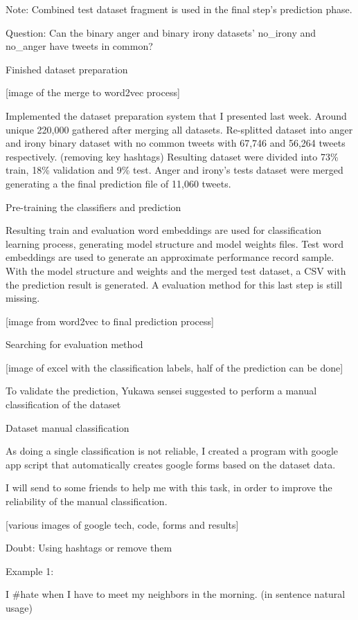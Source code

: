 Note: Combined test dataset fragment is used in the final step’s prediction phase.

Question:
Can the binary anger and binary irony datasets’ no\_irony and no\_anger have tweets in common?

Finished dataset preparation

[image of the merge to word2vec process]

Implemented the dataset preparation system that I presented last week.
Around unique 220,000 gathered after merging all datasets.
Re-splitted dataset into anger and irony binary dataset with no common tweets with 67,746 and 56,264 tweets respectively. (removing key hashtags)
Resulting dataset were divided into 73\% train, 18\% validation and 9\% test.
Anger and irony’s tests dataset were merged generating a the final prediction file of 11,060 tweets.

Pre-training the classifiers and prediction

Resulting train and evaluation word embeddings are used for classification learning process, generating model structure and model weights files.
Test word embeddings are used to generate an approximate performance record sample.
With the model structure and weights and the merged test dataset, a CSV with the prediction result is generated.
A evaluation method for this last step is still missing.

[image from word2vec to final prediction process]

Searching for evaluation method

[image of excel with the classification labels, half of the prediction can be done]

To validate the prediction, Yukawa sensei suggested to perform a manual classification of the dataset

Dataset manual classification

As doing a single classification is not reliable, I created a program with google app script that automatically creates google forms based on the dataset data.

I will send to some friends to help me with this task, in order to improve the reliability of the manual classification.

[various images of google tech, code, forms and results]

Doubt: Using hashtags or remove them

Example 1:

I \#hate when I have to meet my neighbors in the morning. (in sentence natural usage)

